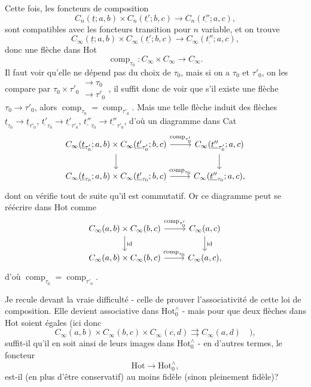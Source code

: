 \documentclass[11pt]{article}
\newcommand{\printedpage}[1]{\marginpar{\footnotesize p.~#1}}
\newcommand{\msp}[1]{\marginpar{\footnotesize [#1]}}
\newcommand{\comp}{\operatorname{comp}}
\newcommand{\Hot}{\mathrm{Hot}}
\begin{document}
\printedpage{79}

Cette fois, les foncteurs de composition
\[ C_n(\underline{t};a,b)\times C_n(\underline{t'};b,c) \longrightarrow C_n(\underline{t''};a,c), \]
sont compatibles avec les foncteurs transition pour $n$ variable, et on trouve
\msp{page 126}
\[ C_\infty(\underline{t};a,b)\times C_\infty(\underline{t'};b,c) \longrightarrow C_\infty(\underline{t''};a,c), \]
donc une flèche dans Hot
\[ \comp_{\tau_0} : C_\infty\times C_\infty \longrightarrow C_\infty. \]
Il faut voir qu'elle ne dépend pas du choix de $\tau_0$, mais si on a $\tau_0$ et $\tau'_0$, on les compare par $\tau_0\times\tau'_0 \begin{array}{l}\longrightarrow \tau_0\\ \longrightarrow \tau'_0\end{array}$, il suffit donc de voir que s'il existe une flèche $\tau_0\longrightarrow\tau'_0$, alors $\comp_{\tau_0} = \comp_{\tau'_0}$. Mais une telle flèche induit des flèches $\underline{t}_{\tau_0}\longrightarrow\underline{t}_{\tau'_0}$, $\underline{t'}_{\tau_0}\longrightarrow\underline{t'}_{\tau'_0}$, $\underline{t''}_{\tau_0}\longrightarrow\underline{t''}_{\tau'_0}$, d'où un diagramme dans Cat
\[
\begin{tikzcd}
C_\infty(\underline{t}_{\tau'_0};a,b)\times C_\infty(\underline{t'}_{\tau'_0};b,c) \arrow[r, "{\comp_{\tau'_0}}"] \arrow[d] & C_\infty(\underline{t''}_{\tau'_0};a,c) \arrow[d] \\
C_\infty(\underline{t}_{\tau_0};a,b)\times C_\infty(\underline{t'}_{\tau_0};b,c) \arrow[r, "{\comp_{\tau_0}}"] & C_\infty(\underline{t''}_{\tau_0};a,c),
\end{tikzcd}
\]
dont on vérifie tout de suite qu'il est commutatif. Or ce diagramme peut se réécrire dans Hot comme
\[
\begin{tikzcd}
C_\infty(a,b)\times C_\infty(b,c) \arrow[r, "{\comp_{\tau'_0}}"] \arrow[d, "{\mathrm{id}}"] & C_\infty(a,c) \arrow[d, "{\mathrm{id}}"] \\
C_\infty(a,b)\times C_\infty(b,c) \arrow[r, "{\comp_{\tau_0}}"] & C_\infty(a,c),
\end{tikzcd}
\]
\msp{page 127}
d'où $\comp_{\tau_0} = \comp_{\tau'_0}$.

Je recule devant la vraie difficulté - celle de prouver l'associativité de cette loi de composition. Elle devient associative dans $\Hot^{\wedge}_{0}$ - mais pour que deux flèches dans Hot soient égales (ici donc
\[ C_\infty(a,b)\times C_\infty(b,c)\times C_\infty(c,d) \rightrightarrows C_\infty(a,d)\quad ), \]
suffit-il qu'il en soit ainsi de leurs images dans $\Hot^{\wedge}_{0}$ - en d'autres termes, le foncteur
\[ \Hot\longrightarrow\Hot^{\wedge}_{0}, \]
est-il (en plus d'être conservatif) au moins fidèle (sinon pleinement fidèle)?
\end{document}

